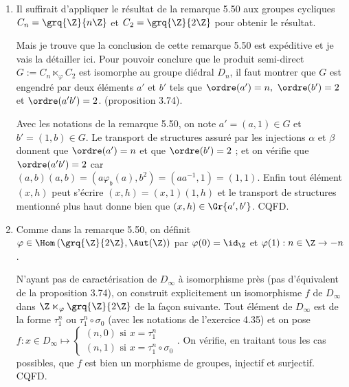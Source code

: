 
\begin{enumerate}
  \item Il suffirait d'appliquer le résultat de la remarque 5.50 aux groupes cycliques $C_n = \grq{\Z}{n\Z}$ et $C_2 = \grq{\Z}{2\Z}$ pour obtenir le résultat.

  Mais je trouve que la conclusion de cette remarque 5.50 est expéditive et je vais la détailler ici. Pour pouvoir conclure que le produit semi-direct $G:=C_n\ltimes_{\varphi}C_2$ est isomorphe au groupe diédral $D_n$, il faut montrer que $G$ est engendré par deux éléments $a'$ et $b'$ tels que $\ordre(a')=n,~ \ordre(b')=2$ et $\ordre(a'b')=2$. (proposition 3.74).

  Avec les notations de la remarque 5.50, on note $a'=(a,1)\in G$ et $b'=(1,b)\in G$. Le transport de structures assuré par les injections $\alpha$ et $\beta$ donnent que  $\ordre(a')=n$ et que $\ordre(b')=2$ ; et on vérifie que $\ordre(a'b')=2$ car $(a,b)(a,b) = (a\varphi_b(a), b^2) = (aa^{-1},1)=(1,1)$. Enfin tout élément $(x,h)$ peut s'écrire $(x,h)=(x,1)(1,h)$ et le transport de structures mentionné plus haut donne bien que $(x,h) \in \Gr{a',b'}$. CQFD.

  \item Comme dans la remarque 5.50, on définit $\varphi \in \Hom\left( \grq{\Z}{2\Z}, \Aut(\Z)\right)$ par $\varphi(0) = \id_{\Z}$ et $\varphi(1) : n\in \Z \to -n$.

  N'ayant pas de caractérisation de $D_{\infty}$ à isomorphisme près (pas d'équivalent de la proposition 3.74), on construit explicitement un isomorphisme $f$ de $D_{\infty}$ dans $\Z \ltimes_{\varphi}\grq{\Z}{2\Z}$ de la façon suivante. Tout élément de $D_{\infty}$ est de la forme $\tau_1^n$ ou $\tau_1^n \circ \sigma_0$ (avec les notations de l'exercice 4.35) et on pose $f\colon x\in D_{\infty}
\mapsto \begin{cases} (n,0) \text{ si } x = \tau_1^n\\ (n,1) \text{ si } x = \tau_1^n\circ \sigma_0\end{cases}$. On vérifie, en traitant tous les cas possibles, que $f$ est bien un morphisme de groupes, injectif et surjectif. CQFD.


\end{enumerate}
